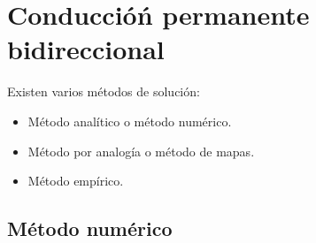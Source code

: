 \section{Conduccióń permanente bidireccional}
Existen varios métodos de solución:

\begin{itemize}
    \item Método analítico o método numérico.
    \item Método por analogía o método de mapas.
    \item Método empírico.
\end{itemize}

\subsection{Método numérico}

